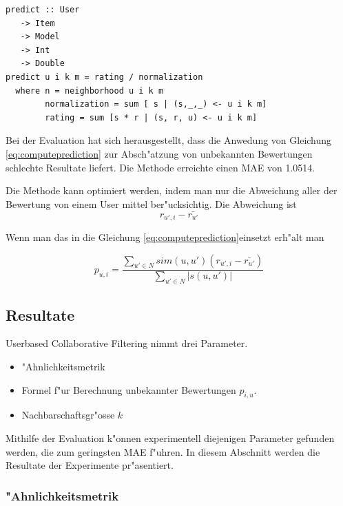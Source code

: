 \documentclass[a4paper, 12pt]{article}
\begin{document}
\begin{lstlisting}[caption=Berechnung von $p_{u,i}$, label=lst:knnpredict]
  predict :: User
   -> Item
   -> Model
   -> Int
   -> Double
predict u i k m = rating / normalization
  where n = neighborhood u i k m
        normalization = sum [ s | (s,_,_) <- u i k m]
        rating = sum [s * r | (s, r, u) <- u i k m]
\end{lstlisting}

Bei der Evaluation hat sich herausgestellt, dass die Anwedung von Gleichung \ref{eq:computeprediction} zur Absch"atzung von unbekannten Bewertungen schlechte Resultate liefert. Die Methode erreichte einen MAE von 1.0514. 

Die Methode kann optimiert werden, indem man nur die Abweichung aller der Bewertung von einem User mittel ber"ucksichtig. Die Abweichung ist
\begin{equation}
  \label{eq:dev2}
r_{u',i} - \bar{r_{u'}}
\end{equation}

Wenn man das in die Gleichung \ref{eq:computeprediction}einsetzt erh"alt man

\begin{equation}
  \label{eq:optcomputeprediction}
  p_{u,i} = \frac{\sum_{u' \in N}{sim(u,u') (r_{u',i} - \bar{r_{u'}})}}{\sum_{u' \in N}{|s(u,u')|}}
\end{equation}

\subsection{Resultate}
\label{sec:userbasedresults}

Userbased Collaborative Filtering nimmt drei Parameter.
\begin{itemize}
\item "Ahnlichkeitsmetrik
\item Formel f"ur Berechnung unbekannter Bewertungen $p_{i,u}$.
\item Nachbarschaftsgr"osse $k$
\end{itemize}

Mithilfe der Evaluation k"onnen experimentell diejenigen Parameter gefunden werden, die zum geringsten MAE f"uhren. In diesem Abschnitt werden die Resultate der Experimente pr"asentiert. 

\subsubsection{"Ahnlichkeitsmetrik}
\label{sec:simresults}
\end{document}
